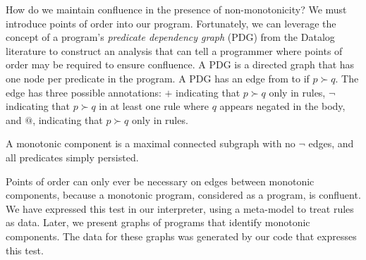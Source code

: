 How do we maintain confluence in the presence of non-monotonicity?  We must
introduce points of order into our program. 
Fortunately, we can leverage the concept of a program's {\em predicate
dependency graph} (PDG) from the Datalog literature to construct an analysis
that can tell a programmer where points of order may be required to ensure
confluence.  A PDG is a directed graph that has one node per predicate in the
program.  A PDG has an edge from  to  if $p \succ q$.
The edge has three possible annotations: $+$ indicating that $p \succ q$ only in
 rules, $\lnot$ indicating that $p \succ q$ in at least one rule
where $q$ appears negated in the body, and $@$, indicating that $p \succ q$
only in  rules.

\begin{definition}
%
A monotonic component is a maximal connected subgraph with no $\lnot$ edges,
and all  predicates simply persisted.
%
\end{definition}

Points of order can only ever be necessary on edges between monotonic
components, because a monotonic program, considered as a \lang program, is
confluent.  We have expressed this test   in our \lang interpreter, using a
meta-model to treat rules as data.  Later, we present graphs of programs that
identify monotonic components.  The data for these graphs was generated by our
\lang code that expresses this test.


